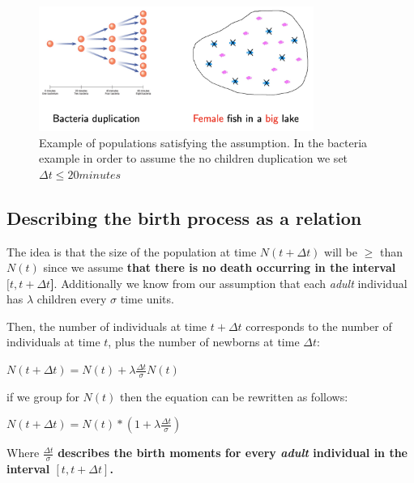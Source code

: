 \begin{figure}[h]
    \centering
    \includegraphics[width=0.8\textwidth]{Images/02-Discrete Dynamical Systems/Example_Linear_Birth_Model.png}
    \caption{Example of populations satisfying the assumption. In the bacteria example in order to assume
            the no children duplication we set $\Delta{t} \leq 20 minutes$} 
\end{figure}

\subsection{Describing the birth process as a relation}
The idea is that the size of the population at time $N(t + \Delta{t})$ will be $\geq$ than $N(t)$ since we assume \textbf{that there is no death occurring in the interval $ [t, t + \Delta{t}$]}. Additionally we know from our assumption that each \textit{adult} individual has $\lambda$ children every $\sigma$ time units.
\par Then, the number of individuals at time $t + \Delta{t}$ corresponds to the number of individuals at time $t$, plus the number of newborns at time $\Delta{t}$:

\begin{center}
    $N(t + \Delta{t}) = N(t) + \lambda{\frac{\Delta{t}}{\sigma}{N(t)}}$
\end{center}
if we group for $N(t)$ then the equation can be rewritten as follows:
\begin{center}
    $N(t + \Delta{t}) = N(t) * (1 + \lambda{\frac{\Delta{t}}{\sigma}}) $
\end{center}
    

\par Where $\frac{\Delta{t}}{\sigma}$ \textbf{describes the birth moments for every \textit{adult} individual in the interval $[t, t + \Delta{t}]$.}

